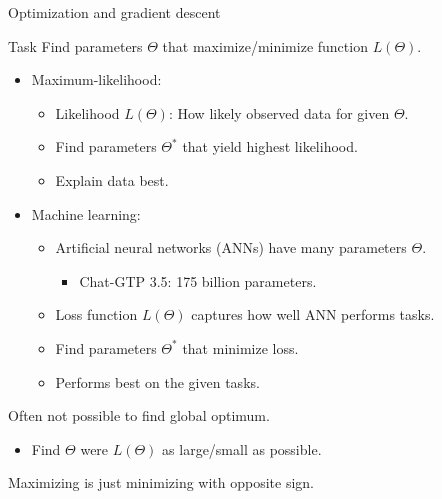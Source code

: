 \documentclass{beamer}
\newcommand{\1}{\ensuremath{\mathbf{1}}}
\begin{document}
\begin{frame}{Optimization and gradient descent}
    \begin{block}{Task}
        Find parameters $\Theta$ that maximize/minimize function $L(\Theta)$.
    \end{block}
    \begin{itemize}
        \item Maximum-likelihood:
        \begin{itemize}
            \item Likelihood $L(\Theta)$: How likely observed data for given $\Theta$.
            \item Find parameters $\Theta^*$ that yield highest likelihood.
            \item Explain data best.
        \end{itemize}
        \item Machine learning:
        \begin{itemize}
            \item Artificial neural networks (ANNs) have many parameters $\Theta$.
            \begin{itemize}
                \item Chat-GTP 3.5: 175 billion parameters.
            \end{itemize}
            \item Loss function $L(\Theta)$ captures how well ANN performs tasks.
            \item Find parameters $\Theta^*$ that minimize loss.
            \item Performs best on the given tasks.
        \end{itemize}
    \end{itemize}
    \begin{block}{}
        Often not possible to find global optimum.
        \begin{itemize}
            \item Find $\Theta$ were $L(\Theta)$ as large/small as possible.
        \end{itemize}
    \end{block}
    Maximizing is just minimizing with opposite sign.
\end{frame}
%
%
%
\end{document}
